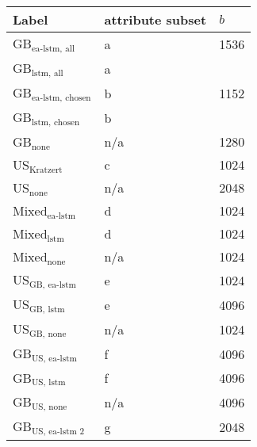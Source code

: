 \begin{tabular}{lll}
    \hline
    Label & attribute subset & $b$ \\
    \hline
    GB$_\text{ea-lstm, all}$ & a &  1536 \\
    GB$_\text{lstm, all}$ & a &  \\
    GB$_\text{ea-lstm, chosen}$ & b & 1152 \\
    GB$_\text{lstm, chosen}$ & b &  \\
    GB$_\text{none}$ & n/a & 1280 \\
    US$_\text{Kratzert}$  & c & 1024 \\
    US$_\text{none}$  & n/a & 2048 \\
    Mixed$_\text{ea-lstm}$ & d & 1024 \\
    Mixed$_\text{lstm}$ & d & 1024 \\
    Mixed$_\text{none}$ & n/a & 1024 \\
    US$_\text{GB, ea-lstm}$ & e  & 1024 \\
    US$_\text{GB, lstm}$ & e  & 4096 \\
    US$_\text{GB, none}$ & n/a & 1024 \\
    GB$_\text{US, ea-lstm}$ & f & 4096 \\
    GB$_\text{US, lstm}$  & f & 4096 \\ 
    GB$_\text{US, none}$  & n/a & 4096 \\
    GB$_\text{US, ea-lstm 2}$ & g & 2048 \\

\end{tabular}
